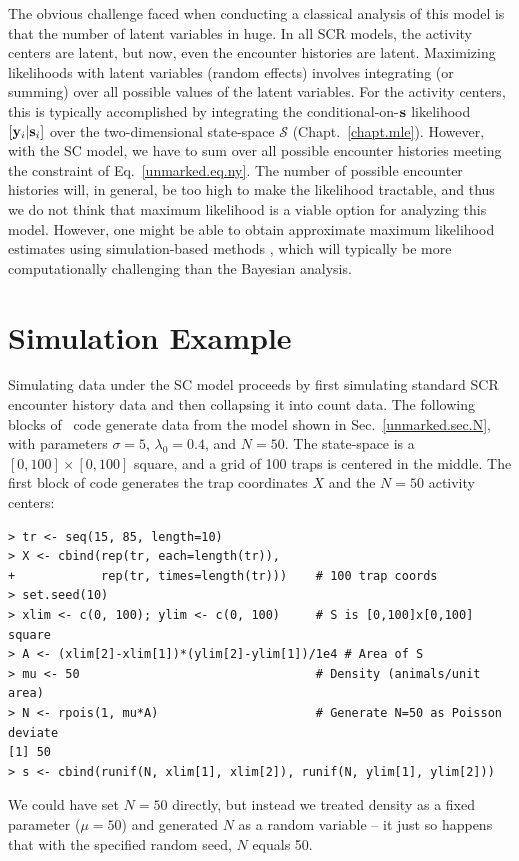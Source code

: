 The obvious challenge faced when conducting a classical analysis of
this model is that the number of latent variables in huge. In all SCR models, the activity centers are
latent, but now, even the encounter histories are latent.
Maximizing likelihoods with latent variables (random effects) involves
integrating (or summing) over all possible values of the latent
variables. For the activity centers, this is typically accomplished by
integrating the conditional-on-$\bf s$ likelihood $[{\bf y}_i|{\bf s}_i]$ over the two-dimensional
state-space $\mathcal{S}$ (Chapt.~\ref{chapt.mle}). However, with
the SC model, we have to sum
over all possible encounter histories %
meeting the
constraint of Eq.~\ref{unmarked.eq.ny}. The
number of possible encounter histories
will, in general, be too high to make the likelihood tractable,
and thus we do not think that maximum likelihood is a viable option
for analyzing this model. However, one might be able to obtain
approximate maximum
likelihood estimates using simulation-based methods
\citep{lele_etal:2010},
which will typically be more computationally
challenging than the Bayesian analysis.

\section{Simulation Example}

Simulating data under the SC model proceeds by first simulating
standard SCR encounter history data and then collapsing it into count
data. The following blocks of \R~code generate data from
the model shown in Sec.~\ref{unmarked.sec.N}, with parameters
$\sigma=5$, $\lambda_0=0.4$, and $N=50$. The state-space is a
$[0, 100] \times [0, 100]$ square, and a grid of 100 traps
is centered in the middle.
The first block of code generates the trap coordinates
$X$ and the $N=50$ activity centers:
\begin{small}
\begin{verbatim}
> tr <- seq(15, 85, length=10)
> X <- cbind(rep(tr, each=length(tr)),
+            rep(tr, times=length(tr)))    # 100 trap coords
> set.seed(10)
> xlim <- c(0, 100); ylim <- c(0, 100)     # S is [0,100]x[0,100] square
> A <- (xlim[2]-xlim[1])*(ylim[2]-ylim[1])/1e4 # Area of S
> mu <- 50                                 # Density (animals/unit area)
> N <- rpois(1, mu*A)                      # Generate N=50 as Poisson deviate
[1] 50
> s <- cbind(runif(N, xlim[1], xlim[2]), runif(N, ylim[1], ylim[2]))
\end{verbatim}
\end{small}
We could have set $N=50$ directly, but instead we treated density
as a fixed parameter ($\mu=50$) and generated $N$ as a random
variable -- it just so happens that with the specified random seed,
$N$ equals 50. %

